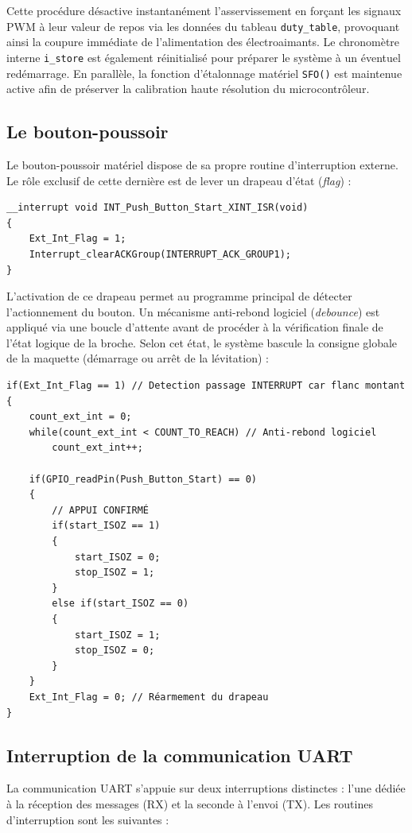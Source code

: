 Cette procédure désactive instantanément l'asservissement en forçant les signaux PWM à leur valeur de repos via les données du tableau \texttt{duty\_table}, provoquant ainsi la coupure immédiate de l'alimentation des électroaimants. Le chronomètre interne \texttt{i\_store} est également réinitialisé pour préparer le système à un éventuel redémarrage. En parallèle, la fonction d'étalonnage matériel \texttt{SFO()} est maintenue active afin de préserver la calibration haute résolution du microcontrôleur.

\subsection{Le bouton-poussoir}
Le bouton-poussoir matériel dispose de sa propre routine d'interruption externe. Le rôle exclusif de cette dernière est de lever un drapeau d'état (\textit{flag}) :

\begin{verbatim}
__interrupt void INT_Push_Button_Start_XINT_ISR(void)
{
    Ext_Int_Flag = 1;
    Interrupt_clearACKGroup(INTERRUPT_ACK_GROUP1);
}
\end{verbatim}

L'activation de ce drapeau permet au programme principal de détecter l'actionnement du bouton. Un mécanisme anti-rebond logiciel (\textit{debounce}) est appliqué via une boucle d'attente avant de procéder à la vérification finale de l'état logique de la broche. Selon cet état, le système bascule la consigne globale de la maquette (démarrage ou arrêt de la lévitation) :

\begin{verbatim}
if(Ext_Int_Flag == 1) // Detection passage INTERRUPT car flanc montant
{
    count_ext_int = 0;
    while(count_ext_int < COUNT_TO_REACH) // Anti-rebond logiciel
        count_ext_int++;

    if(GPIO_readPin(Push_Button_Start) == 0)
    {
        // APPUI CONFIRMÉ
        if(start_ISOZ == 1)
        {
            start_ISOZ = 0;
            stop_ISOZ = 1;
        }
        else if(start_ISOZ == 0)
        {
            start_ISOZ = 1;
            stop_ISOZ = 0;
        }
    }
    Ext_Int_Flag = 0; // Réarmement du drapeau
}
\end{verbatim}

\subsection{Interruption de la communication UART}
La communication UART s'appuie sur deux interruptions distinctes : l'une dédiée à la réception des messages (RX) et la seconde à l'envoi (TX). Les routines d'interruption sont les suivantes :

